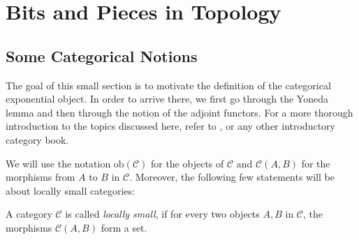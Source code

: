 \chapter{Bits and Pieces in Topology}
\section{Some Categorical Notions}
The goal of this small section is to motivate the definition of the categorical exponential object. In order to arrive there, we first go through the Yoneda lemma and then through the notion of the adjoint functors. For a more thorough introduction to the topics discussed here, refer to \cite{basic_cat}, or any other introductory category book.

We will use the notation $\mathrm{ob}(\mathcal{C})$ for the objects of $\mathcal{C}$ and $\mathcal{C}(A,B)$ for the morphisms from $A$ to $B$ in $\mathcal{C}$. Moreover, the following few statements will be about locally small categories:
\begin{definition} A category $\mathcal{C}$ is called \emph{locally small}, if for every two objects $A,B$ in $\mathcal{C}$, the morphisms $\mathcal{C}(A,B)$ form a set.
\end{definition}

